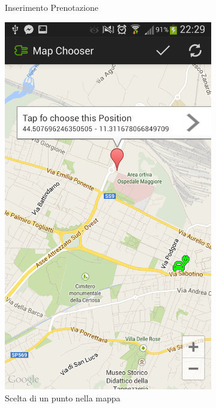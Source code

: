 \begin{figure}
\begin{subfigure}{0.45\textwidth}
		\caption{Inserimento Prenotazione}
		\label{fig:charge-request}
	\end{subfigure}
	\begin{subfigure}{0.45\textwidth}
		\includegraphics[width=\textwidth]{assets/mobile-app-map-chooser.png}
		\caption{Scelta di un punto nella mappa}
		\label{fig:map-chooser}
	\end{subfigure}
	\begin{subfigure}{0.45\textwidth}

\end{subfigure}
\end{figure}
